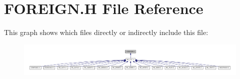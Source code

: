 \hypertarget{FOREIGN_8H}{
\section{FOREIGN.H File Reference}
\label{FOREIGN_8H}
}
This graph shows which files directly or indirectly include this file:
\nopagebreak
\begin{figure}[H]
\begin{center}
\leavevmode
\includegraphics[width=400pt]{FOREIGN_8H__dep__incl}
\end{center}
\end{figure}
